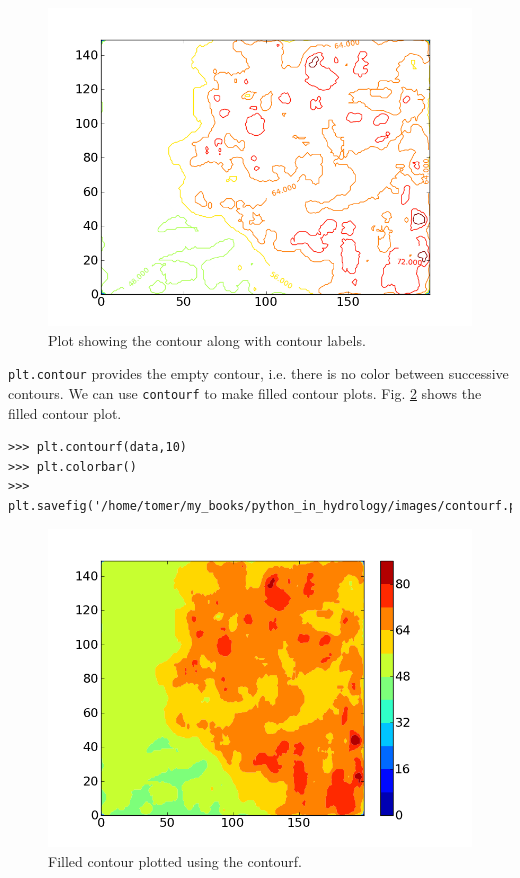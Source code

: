 \documentclass[10pt]{book}
\begin{document}
{\beforefig
\begin{figure}[h!]
  \centering
    \includegraphics[scale=0.5]{images/contour.png}
  \caption{Plot showing the contour along with contour labels.}
   \label{fig:contour}
\end{figure}
\afterfig

\verb"plt.contour" provides the empty contour, i.e. there is no color between successive contours. We can use \verb"contourf" to make filled contour plots. Fig. \ref{fig:contourf} shows the filled contour plot. 
\beforeverb
\begin{verbatim}
>>> plt.contourf(data,10)
>>> plt.colorbar()
>>> plt.savefig('/home/tomer/my_books/python_in_hydrology/images/contourf.png')
\end{verbatim}
\afterverb
{}

\beforefig
\begin{figure}[h!]
  \centering
    \includegraphics[scale=0.5]{images/contourf.png}
  \caption{Filled contour plotted using the contourf.}
   \label{fig:contourf}
\end{figure}
\afterfig

}
\end{document}
